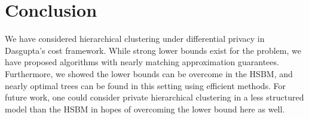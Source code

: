 \section{Conclusion}
We have considered hierarchical clustering under differential privacy in Dasgupta's cost framework. While strong lower bounds exist for the problem, we have proposed algorithms with nearly matching approximation guarantees. Furthermore, we showed the lower bounds can be overcome in the HSBM, and nearly optimal trees can be found in this setting using efficient methods. For future work, one could consider private hierarchical clustering in a less structured model than the HSBM in hopes of overcoming the lower bound here as well.